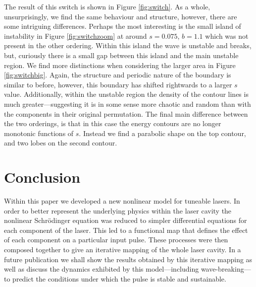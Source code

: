 \documentclass[10pt,twocolumn,a4paper]{article}
\begin{document}
The result of this switch is shown in Figure \ref{fig:switch}. As a whole, unsurprisingly, we find the same behaviour and structure, however, there are some intriguing differences. Perhaps the most interesting is the small island of instability in Figure \ref{fig:switchzoom} at around $s = 0.075$, $b = 1.1$ which was not present in the other ordering. Within this island the wave is unstable and breaks, but, curiously there is a small gap between this island and the main unstable region. We find more distinctions when considering the larger area in Figure \ref{fig:switchbig}. Again, the structure and periodic nature of the boundary is similar to before, however, this boundary has shifted rightwards to a larger $s$ value. Additionally, within the unstable region the density of the contour lines is much greater---suggesting it is in some sense more chaotic and random than with the components in their original permutation. The final main difference between the two orderings, is that in this case the energy contours are no longer monotonic functions of $s$. Instead we find a parabolic shape on the top contour, and two lobes on the second contour. \\






\section{Conclusion}
Within this paper we developed a new nonlinear model for tuneable lasers. In order to better represent the underlying physics within the laser cavity the nonlinear Schr\"{o}dinger equation was reduced to simpler differential equations for each component of the laser. This led to a functional map that defines the effect of each component on a particular input pulse. These processes were then composed together to give an iterative mapping of the whole laser cavity. In a future publication we shall show the results obtained by this iterative mapping as well as discuss the dynamics exhibited by this model---including wave-breaking---to predict the conditions under which the pulse is stable and sustainable.



\end{document}
